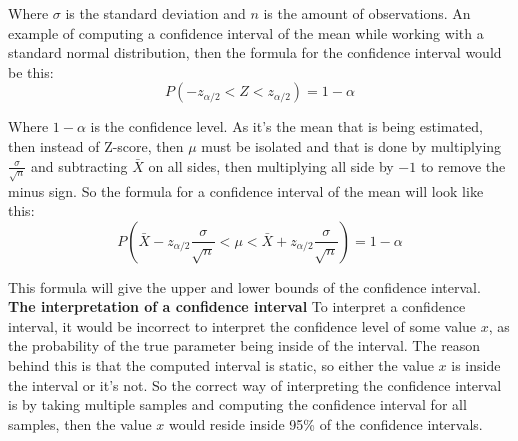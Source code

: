 \noindent Where $\sigma$ is the standard deviation and $n$ is the amount of observations. An example of computing a confidence interval of the mean while working with a standard normal distribution, then the formula for the confidence interval would be this:
\begin{equation}
P(-z_{\alpha/2}<Z<z_{\alpha/2}) = 1-\alpha
\end{equation}

\noindent Where $1-\alpha$ is the confidence level. As it's the mean that is being estimated, then instead of Z-score, then $\mu$ must be isolated and that is done by multiplying $\frac{\sigma}{\sqrt{n}}$ and subtracting $\bar{X}$ on all sides, then multiplying all side by $-1$ to remove the minus sign. So the formula for a confidence interval of the mean will look like this:
\begin{equation}
P(\bar{X}-z_{\alpha/2}\frac{\sigma}{\sqrt{n}}<\mu<\bar{X}+z_{\alpha/2}\frac{\sigma}{\sqrt{n}})=1-\alpha
\end{equation}

\noindent This formula will give the upper and lower bounds of the confidence interval.\\

\noindent \textbf{The interpretation of a confidence interval}
\newline
To interpret a confidence interval, it would be incorrect to interpret the confidence level of some value $x$, as the probability of the true parameter being inside of the interval. The reason behind this is that the computed interval is static, so either the value $x$ is inside the interval or it's not. So the correct way of interpreting the confidence interval is by taking multiple samples and computing the confidence interval for all samples, then the value $x$ would reside inside 95\% of the confidence intervals.\cite{ProbAndStat_8th}


